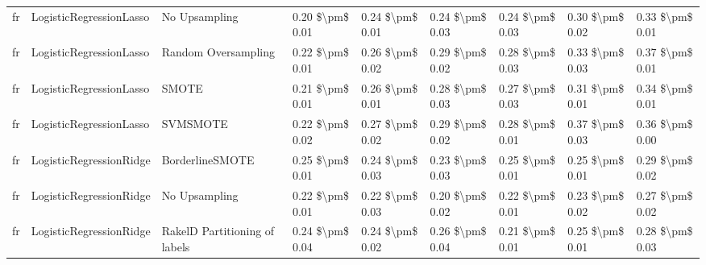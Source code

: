 \begin{tabular}{lllllllll}
      fr &         LogisticRegressionLasso &                 No Upsampling &     0.20 \$\textbackslash pm\$ 0.01 &           0.24 \$\textbackslash pm\$ 0.01 &       0.24 \$\textbackslash pm\$ 0.03 &        0.24 \$\textbackslash pm\$ 0.03 &                         0.30 \$\textbackslash pm\$ 0.02 &     0.33 \$\textbackslash pm\$ 0.01 \\
      fr &         LogisticRegressionLasso &           Random Oversampling &     0.22 \$\textbackslash pm\$ 0.01 &           0.26 \$\textbackslash pm\$ 0.02 &       0.29 \$\textbackslash pm\$ 0.02 &        0.28 \$\textbackslash pm\$ 0.03 &                         0.33 \$\textbackslash pm\$ 0.03 &     0.37 \$\textbackslash pm\$ 0.01 \\
      fr &         LogisticRegressionLasso &                         SMOTE &     0.21 \$\textbackslash pm\$ 0.01 &           0.26 \$\textbackslash pm\$ 0.01 &       0.28 \$\textbackslash pm\$ 0.03 &        0.27 \$\textbackslash pm\$ 0.03 &                         0.31 \$\textbackslash pm\$ 0.01 &     0.34 \$\textbackslash pm\$ 0.01 \\
      fr &         LogisticRegressionLasso &                      SVMSMOTE &     0.22 \$\textbackslash pm\$ 0.02 &           0.27 \$\textbackslash pm\$ 0.02 &       0.29 \$\textbackslash pm\$ 0.02 &        0.28 \$\textbackslash pm\$ 0.01 &                         0.37 \$\textbackslash pm\$ 0.03 &     0.36 \$\textbackslash pm\$ 0.00 \\
      fr &         LogisticRegressionRidge &               BorderlineSMOTE &     0.25 \$\textbackslash pm\$ 0.01 &           0.24 \$\textbackslash pm\$ 0.03 &       0.23 \$\textbackslash pm\$ 0.03 &        0.25 \$\textbackslash pm\$ 0.01 &                         0.25 \$\textbackslash pm\$ 0.01 &     0.29 \$\textbackslash pm\$ 0.02 \\
      fr &         LogisticRegressionRidge &                 No Upsampling &     0.22 \$\textbackslash pm\$ 0.01 &           0.22 \$\textbackslash pm\$ 0.03 &       0.20 \$\textbackslash pm\$ 0.02 &        0.22 \$\textbackslash pm\$ 0.01 &                         0.23 \$\textbackslash pm\$ 0.02 &     0.27 \$\textbackslash pm\$ 0.02 \\
      fr &         LogisticRegressionRidge & RakelD Partitioning of labels &     0.24 \$\textbackslash pm\$ 0.04 &           0.24 \$\textbackslash pm\$ 0.02 &       0.26 \$\textbackslash pm\$ 0.04 &        0.21 \$\textbackslash pm\$ 0.01 &                         0.25 \$\textbackslash pm\$ 0.01 &     0.28 \$\textbackslash pm\$ 0.03 \\

\end{tabular}
